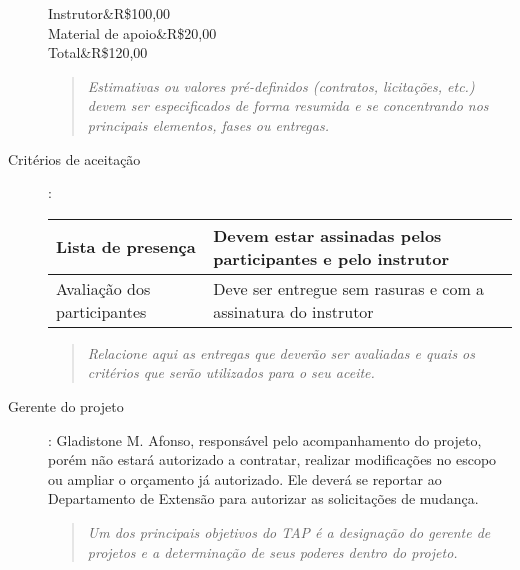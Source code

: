 \begin{description}
\begin{table}[h!]
\begin{tabular}
				\hline
				Instrutor&R\$100,00\\
				\hline
				Material de apoio&R\$20,00\\
				\hline
				Total&R\$120,00\\
				\hline
				
			\end{tabular}
		\end{table}
	

		\begin{quote}
			\emph{Estimativas ou valores pré-definidos (contratos, licitações, etc.) devem ser especificados de forma resumida e se concentrando nos principais elementos, fases ou entregas.}
		\end{quote}

	\item[Critérios de aceitação] :
		
		\begin{table}[h!]
			\centering
			\begin{tabular}
				{
					|l|l|
				}
				
				\hline
				Lista de presença&Devem estar assinadas pelos participantes e pelo instrutor\\
				\hline
				Avaliação dos participantes&Deve ser entregue sem rasuras e com a assinatura do instrutor\\
				\hline
				
			\end{tabular}
		\end{table}
		
		
		\begin{quote}
			\emph{Relacione aqui as entregas que deverão ser avaliadas e quais os critérios que serão utilizados para o seu aceite.}
		\end{quote}

	\item[Gerente do projeto]: Gladistone M. Afonso, responsável pelo acompanhamento do projeto, porém não estará autorizado a contratar, realizar modificações no escopo ou ampliar o orçamento já autorizado. Ele deverá se reportar ao Departamento de Extensão para autorizar as solicitações de mudança.
	
	\begin{quote}
		\emph{Um dos principais objetivos do TAP é a designação do gerente de projetos e a determinação de seus poderes dentro do projeto.}
	\end{quote}

\end{description}